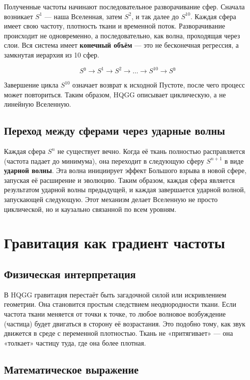 \documentclass[12pt,a4paper]{article}
\begin{document}
Полученные частоты начинают последовательное разворачивание сфер. Сначала возникает \( S^1 \) — наша Вселенная, затем \( S^2 \), и так далее до \( S^{10} \). Каждая сфера имеет свою частоту, плотность ткани и временной поток. Разворачивание происходит не одновременно, а последовательно, как волна, проходящая через слои. Вся система имеет \textbf{конечный объём} — это не бесконечная регрессия, а замкнутая иерархия из 10 сфер.

\[
S^{\text{בּ}} \to S^1 \to S^2 \to \dots \to S^{10} \to S^{\text{בּ}}
\]

Завершение цикла \( S^{10} \) означает возврат к исходной Пустоте, после чего процесс может повториться. Таким образом, HQGG описывает циклическую, а не линейную Вселенную.

\subsection{Переход между сферами через ударные волны}

Каждая сфера \( S^n \) не существует вечно. Когда её ткань полностью расправляется (частота падает до минимума), она переходит в следующую сферу \( S^{n+1} \) в виде \textbf{ударной волны}. Эта волна инициирует эффект Большого взрыва в новой сфере, запуская её расширение и эволюцию. Таким образом, каждая сфера является результатом ударной волны предыдущей, и каждая завершается ударной волной, запускающей следующую. Этот механизм делает Вселенную не просто циклической, но и каузально связанной по всем уровням.

\section{Гравитация как градиент частоты}

\subsection{Физическая интерпретация}

В HQGG гравитация перестаёт быть загадочной силой или искривлением геометрии. Она становится простым следствием неоднородности ткани. Если частота ткани меняется от точки к точке, то любое волновое возбуждение (частица) будет двигаться в сторону её возрастания. Это подобно тому, как звук движется в среде с переменной плотностью. Ткань не «притягивает» — она «толкает» частицу туда, где она более плотная.

\subsection{Математическое выражение}
\end{document}
